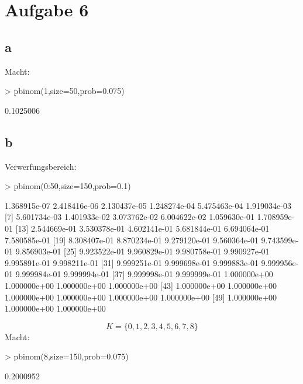 

\section{Aufgabe 6}
\subsection{a}
Macht: 
\begin{Schunk}
\begin{Sinput}
> pbinom(1,size=50,prob=0.075)
\end{Sinput}
\begin{Soutput}
[1] 0.1025006
\end{Soutput}
\end{Schunk}

\subsection{b}
Verwerfungsbereich: 
\begin{Schunk}
\begin{Sinput}
> pbinom(0:50,size=150,prob=0.1)
\end{Sinput}
\begin{Soutput}
 [1] 1.368915e-07 2.418416e-06 2.130437e-05 1.248274e-04 5.475463e-04 1.919034e-03
 [7] 5.601734e-03 1.401933e-02 3.073762e-02 6.004622e-02 1.059630e-01 1.708959e-01
[13] 2.544669e-01 3.530378e-01 4.602141e-01 5.681844e-01 6.694064e-01 7.580585e-01
[19] 8.308407e-01 8.870234e-01 9.279120e-01 9.560364e-01 9.743599e-01 9.856903e-01
[25] 9.923522e-01 9.960829e-01 9.980758e-01 9.990927e-01 9.995891e-01 9.998211e-01
[31] 9.999251e-01 9.999698e-01 9.999883e-01 9.999956e-01 9.999984e-01 9.999994e-01
[37] 9.999998e-01 9.999999e-01 1.000000e+00 1.000000e+00 1.000000e+00 1.000000e+00
[43] 1.000000e+00 1.000000e+00 1.000000e+00 1.000000e+00 1.000000e+00 1.000000e+00
[49] 1.000000e+00 1.000000e+00 1.000000e+00
\end{Soutput}
\end{Schunk}
\[ K = \lbrace 0, 1, 2, 3, 4, 5, 6, 7, 8 \rbrace \]
Macht: 
\begin{Schunk}
\begin{Sinput}
> pbinom(8,size=150,prob=0.075)
\end{Sinput}
\begin{Soutput}
[1] 0.2000952
\end{Soutput}
\end{Schunk}
